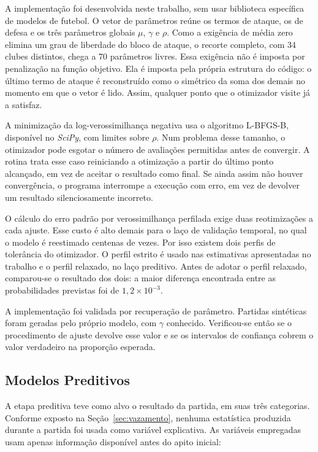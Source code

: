 A implementação foi desenvolvida neste trabalho, sem usar biblioteca específica
de modelos de futebol. O vetor de parâmetros reúne os termos de ataque, os de
defesa e os três parâmetros globais $\mu$, $\gamma$ e $\rho$. Como a exigência de
média zero elimina um grau de liberdade do bloco de ataque, o recorte completo,
com 34 clubes distintos, chega a 70 parâmetros livres. Essa exigência não é
imposta por penalização na função objetivo. Ela é imposta pela própria estrutura
do código: o último termo de ataque é reconstruído como o simétrico da soma dos
demais no momento em que o vetor é lido. Assim, qualquer ponto que o otimizador
visite já a satisfaz.

A minimização da log-verossimilhança negativa usa o algoritmo L-BFGS-B,
disponível no \textit{SciPy}, com limites sobre $\rho$. Num problema desse
tamanho, o otimizador pode esgotar o número de avaliações permitidas antes de
convergir. A rotina trata esse caso reiniciando a otimização a partir do último
ponto alcançado, em vez de aceitar o resultado como final. Se ainda assim não
houver convergência, o programa interrompe a execução com erro, em vez de
devolver um resultado silenciosamente incorreto.

O cálculo do erro padrão por verossimilhança perfilada exige duas reotimizações
a cada ajuste. Esse custo é alto demais para o laço de validação temporal, no
qual o modelo é reestimado centenas de vezes. Por isso existem dois perfis de
tolerância do otimizador. O perfil estrito é usado nas estimativas apresentadas
no trabalho e o perfil relaxado, no laço preditivo. Antes de adotar o perfil
relaxado, comparou-se o resultado dos dois: a maior diferença encontrada entre
as probabilidades previstas foi de $1{,}2 \times 10^{-3}$.

A implementação foi validada por recuperação de parâmetro. Partidas sintéticas
foram geradas pelo próprio modelo, com $\gamma$ conhecido. Verificou-se então se
o procedimento de ajuste devolve esse valor e se os intervalos de confiança
cobrem o valor verdadeiro na proporção esperada.

\subsection{Modelos Preditivos}\label{sec:met-preditivo}

A etapa preditiva teve como alvo o resultado da partida, em suas três
categorias. Conforme exposto na Seção~\ref{sec:vazamento}, nenhuma estatística
produzida durante a partida foi usada como variável explicativa. As variáveis
empregadas usam apenas informação disponível antes do apito inicial:

